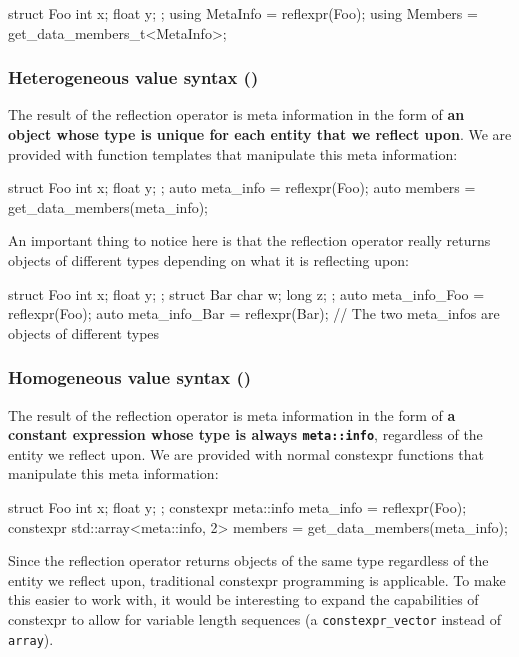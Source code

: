 \documentclass{wg21}
\newcommand{\cc}[1]{\texttt{#1}}
\begin{document}
\begin{cpp}
struct Foo { int x; float y; };
using MetaInfo = reflexpr(Foo);
using Members = get_data_members_t<MetaInfo>;
\end{cpp}

\subsubsection{Heterogeneous value syntax (\cite{P0590})}
The result of the reflection operator is meta information in the form of
\textbf{an object whose type is unique for each entity that we reflect upon}.
We are provided with function templates that manipulate this meta information:

\begin{cpp}
struct Foo { int x; float y; };
auto meta_info = reflexpr(Foo);
auto members = get_data_members(meta_info);
\end{cpp}

An important thing to notice here is that the reflection operator really returns
objects of different types depending on what it is reflecting upon:

\begin{cpp}
struct Foo { int x; float y; };
struct Bar { char w; long z; };
auto meta_info_Foo = reflexpr(Foo);
auto meta_info_Bar = reflexpr(Bar);
// The two meta_infos are objects of different types
\end{cpp}

\subsubsection{Homogeneous value syntax (\cite{P0598})}
The result of the reflection operator is meta information in the form of
\textbf{a constant expression whose type is always \cc{meta::info}}, regardless
of the entity we reflect upon. We are provided with normal constexpr functions
that manipulate this meta information:

\begin{cpp}
struct Foo { int x; float y; };
constexpr meta::info meta_info = reflexpr(Foo);
constexpr std::array<meta::info, 2> members = get_data_members(meta_info);
\end{cpp}

Since the reflection operator returns objects of the same type regardless of
the entity we reflect upon, traditional constexpr programming is applicable.
To make this easier to work with, it would be interesting to expand the
capabilities of constexpr to allow for variable length sequences
(a \cc{constexpr_vector} instead of \cc{array}).
\end{document}
